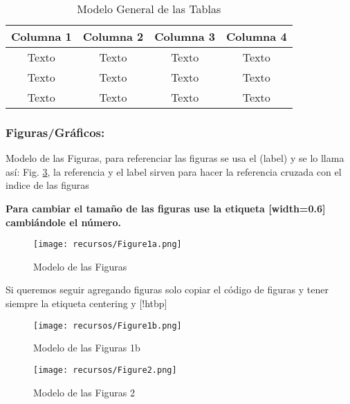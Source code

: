 \begin{table}[!htbp]
\centering
\small
\caption{{\fontsize{11pt}{13}\selectfont Modelo General de las Tablas \cite{upm56279}}}
\label{tbl:modelo}
\begin{tabular}{@{}cccc@{}}
\toprule
\textbf{Columna 1} & \textbf{Columna 2} & \textbf{Columna 3} & \textbf{Columna 4} \\ \midrule
Texto              & Texto              & Texto              & Texto              \\
Texto              & Texto              & Texto              & Texto              \\
Texto              & Texto              & Texto              & Texto              \\ \bottomrule
\end{tabular}
\end{table}

\subsubsection{Figuras/Gráficos:}
Modelo de las Figuras, para referenciar las figuras se usa el (label) y se lo llama así: Fig. \ref{fig:figura1a}, la referencia y el label sirven para hacer la referencia cruzada con el indice de las figuras

\textbf{Para cambiar el tamaño de las figuras use la etiqueta [width=0.6] cambiándole el n\'umero.}

\begin{figure}[!htbp]
    \centering
    \texttt{[image: recursos/Figure1a.png]}
    \caption{Modelo de las Figuras}
    \label{fig:figura1a}
\end{figure}

Si queremos seguir agregando figuras solo copiar el código de figuras y tener siempre la etiqueta centering y [!htbp]

\begin{figure}[!htbp]
    \centering
    \texttt{[image: recursos/Figure1b.png]}
    \caption{Modelo de las Figuras 1b \cite{upm56279}}
    \label{fig:figura1a}
\end{figure}

\begin{figure}[!htbp]
    \centering
    \texttt{[image: recursos/Figure2.png]}
    \caption{Modelo de las Figuras 2 \cite{upm56279}}
    \label{fig:figura1a}
\end{figure}

